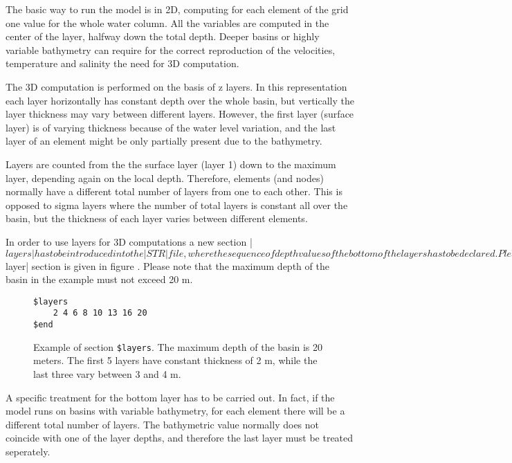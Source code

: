 
The basic way to run the model is in 2D, computing for each element of the
grid one value for the whole water column.  All the variables are computed
in the center of the layer, halfway down the total depth.  Deeper basins
or highly variable bathymetry can require for the correct reproduction
of the velocities, temperature and salinity the need for 3D computation.

The 3D computation is performed on the basis of z layers. In this
representation each layer horizontally has constant depth over the whole
basin, but vertically the layer thickness may vary between different
layers. However, the first layer (surface layer) is of varying thickness
because of the water level variation, and the last layer of an element
might be only partially present due to the bathymetry.

Layers are counted from the the surface layer (layer 1) down to the
maximum layer, depending again on the local depth. Therefore, elements
(and nodes) normally have a different total number of layers from one to
each other. This is opposed to sigma layers where the number of total
layers is constant all over the basin, but the thickness of each layer
varies between different elements.

In order to use layers for 3D computations a new section |$layers|
has to be introduced into the |STR| file, where the sequence of depth
values of the bottom of the layers has to be declared.  Please, make sure
that in the file |Rules.make|, the number of allowed levels |nlvdim| is
greater or equal than the ones actually used in the |STR| file. Layer
depths must be declared in increasing order. An example of a |$layer|
section is given in figure . Please note that the maximum
depth of the basin in the example must not exceed 20 m.

\begin{figure}[ht]
\begin{verbatim}
$layers
	2 4 6 8 10 13 16 20
$end
\end{verbatim}
\caption{Example of section {\tt \$layers}. The maximum depth of 
the basin is 20 meters. The first 5 layers have constant thickness 
of 2 m, while the last three vary between 3 and 4 m.}
\label{fig:layers}
\end{figure}

A specific treatment for the bottom layer has to be carried out.  In fact,
if the model runs on basins with variable bathymetry, for each element
there will be a different total number of layers. The bathymetric value
normally does not coincide with one of the layer depths, and therefore
the last layer must be treated seperately.

